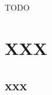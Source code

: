 \documentclass[../thesis.tex]{subfiles}
\begin{document}
TODO

\section{XXX}
\subsection{xxx}
\end{document}
